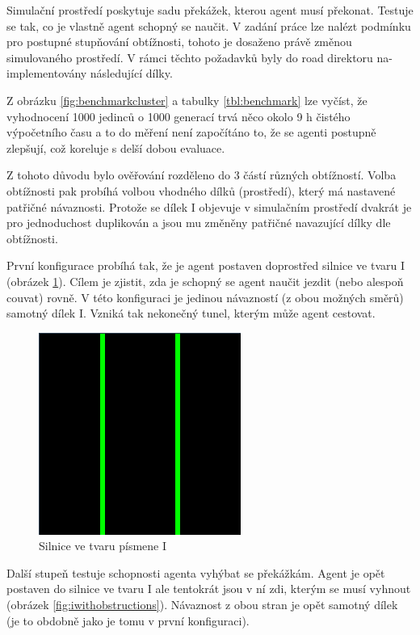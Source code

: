 \label{sec:simulationEnvironment}
Simulační prostředí poskytuje sadu překážek, kterou agent musí překonat. Testuje se tak, co je vlastně agent schopný se naučit. V zadání práce lze nalézt podmínku pro postupné stupňování obtížnosti, tohoto je dosaženo právě změnou simulovaného prostředí. V rámci těchto požadavků byly do road direktoru na-implementovány následující dílky.

Z obrázku \ref{fig:benchmarkcluster} a tabulky \ref{tbl:benchmark} lze vyčíst, že vyhodnocení 1000 jedinců o 1000 generací trvá něco okolo 9 h čistého výpočetního času a to do měření není započítáno to, že se agenti postupně zlepšují, což koreluje s delší dobou evaluace. 

Z tohoto důvodu bylo ověřování rozděleno do 3 částí různých obtížností. Volba obtížnosti pak probíhá volbou vhodného dílků (prostředí), který má nastavené patřičné návaznosti. Protože se dílek I objevuje v simulačním prostředí dvakrát je pro jednoduchost duplikován a jsou mu změněny patřičné navazující dílky dle obtížnosti.

První konfigurace probíhá tak, že je agent postaven doprostřed silnice ve tvaru I (obrázek \ref{fig:i}). Cílem je zjistit, zda je schopný se agent naučit jezdit (nebo alespoň couvat) rovně. V této konfiguraci je jedinou návazností (z obou možných směrů) samotný dílek I. Vzniká tak nekonečný tunel, kterým může agent cestovat.

\begin{figure}[H]
	\centering
	\includegraphics[scale=0.5]{pieces/I}
	\caption{Silnice ve tvaru písmene I}
	\label{fig:i}
\end{figure}
  

Další stupeň testuje schopnosti agenta vyhýbat se překážkám. Agent je opět postaven do silnice ve tvaru I ale tentokrát jsou v ní zdi, kterým se musí vyhnout (obrázek \ref{fig:iwithobstructions}). Návaznost z obou stran je opět samotný dílek (je to obdobně jako je tomu v první konfiguraci).

